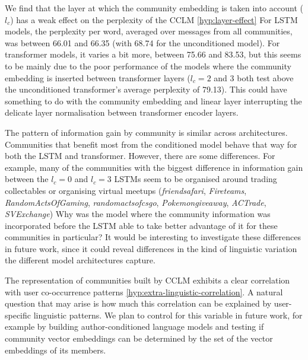 \documentclass[11pt]{article}
\begin{document}
We find that the layer at which the community embedding is taken into
account ($l_c$) has a weak effect on the perplexity of the CCLM
\ref{hyp:layer-effect}
For LSTM models, the perplexity per word, averaged over
messages from all communities, was between \num{66.01} and \num{66.35}
(with \num{68.74} for the unconditioned model).
For transformer models, it varies a bit more, between \num{75.66} and \num{83.53},
but this seems to be mainly due to the poor performance of the models where
the community embedding is inserted between transformer layers
($l_c=2$ and $3$ both test above the unconditioned transformer's 
average perplexity of \num{79.13}).
This could have something to do with the community embedding and linear layer
interrupting the delicate layer normalisation between transformer encoder layers.

The pattern of information gain by community is similar across
architectures.  Communities that benefit most from the conditioned
model behave that way for both the LSTM and transformer.  However,
there are some differences.  For example, many of the communities with the biggest 
difference in information gain between the $l_c=0$ and $l_c=3$ LSTMs 
seem to be organised around trading collectables or organising virtual meetups
(\emph{friendsafari},
\emph{Fireteams},
\emph{RandomActsOfGaming},
\emph{randomactsofcsgo},
\emph{Pokemongiveaway},
\emph{ACTrade},
\emph{SVExchange})
Why was the model where the community information was incorporated before
the LSTM able to take better advantage of it for these communities in particular? 
It would be interesting to investigate these differences in future work, since it
could reveal differences in the kind of linguistic variation the
different model architectures capture.

The representation of communities built by CCLM exhibits a clear
correlation with user co-occurrence patterns
\ref{hyp:extra-linguistic-correlation}. A natural
question that may arise is how much this correlation can be explained by
user-specific linguistic patterns. We plan to control for this variable
in future work, for example by building author-conditioned language
models and testing if community vector embeddings can be determined by
the set of the vector embeddings of its members.



\end{document}

